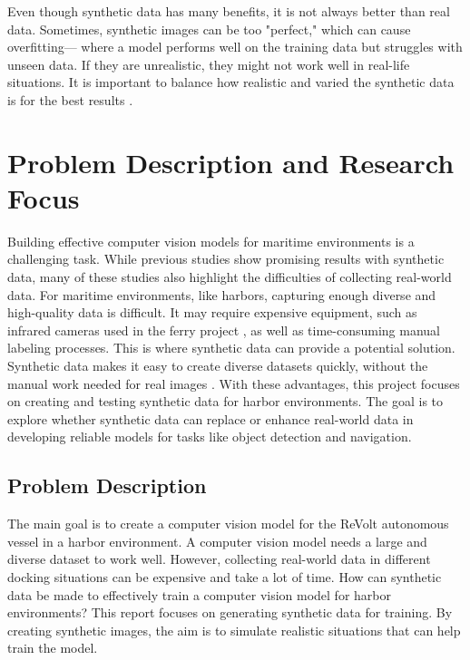 \noindent Even though synthetic data has many benefits, it is not always better than real data. Sometimes, synthetic images can be too "perfect," which can cause overfitting— where a model performs well on the training data but struggles with unseen data. If they are unrealistic, they might not work well in real-life situations. It is important to balance how realistic and varied the synthetic data is for the best results \cite{nikolenko2021synthetic}.


\section{Problem Description and Research Focus}

Building effective computer vision models for maritime environments is a challenging task. While previous studies show promising results with synthetic data, many of these studies also highlight the difficulties of collecting real-world data. For maritime environments, like harbors, capturing enough diverse and high-quality data is difficult. It may require expensive equipment, such as infrared cameras used in the ferry project \cite{NTNUFerry}, as well as time-consuming manual labeling processes. This is where synthetic data can provide a potential solution. \\

\noindent Synthetic data makes it easy to create diverse datasets quickly, without the manual work needed for real images \cite{nikolenko2021synthetic}. With these advantages, this project focuses on creating and testing synthetic data for harbor environments. The goal is to explore whether synthetic data can replace or enhance real-world data in developing reliable models for tasks like object detection and navigation.


\subsection{Problem Description}
The main goal is to create a computer vision model for the ReVolt autonomous vessel in a harbor environment. A computer vision model needs a large and diverse dataset to work well. However, collecting real-world data in different docking situations can be expensive and take a lot of time. How can synthetic data be made to effectively train a computer vision model for harbor environments? This report focuses on generating synthetic data for training. By creating synthetic images, the aim is to simulate realistic situations that can help train the model.  

